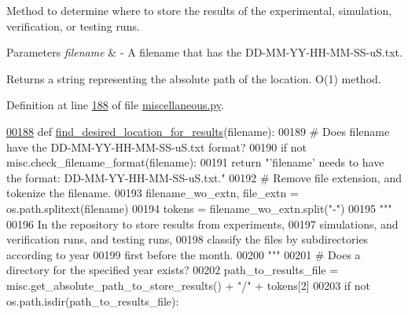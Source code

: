 Method to determine where to store the results of the experimental, simulation, verification, or testing runs. 


\begin{DoxyParams}{Parameters}
{\em filename} & -\/ A filename that has the D\+D-\/\+M\+M-\/\+Y\+Y-\/\+H\+H-\/\+M\+M-\/\+S\+S-\/u\+S.\+txt. \\
\hline
\end{DoxyParams}
\begin{DoxyReturn}{Returns}
a string representing the absolute path of the location. O(1) method. 
\end{DoxyReturn}


Definition at line \hyperlink{miscellaneous_8py_source_l00188}{188} of file \hyperlink{miscellaneous_8py_source}{miscellaneous.\+py}.


\begin{DoxyCode}
\hypertarget{classutilities_1_1miscellaneous_1_1misc_l00188}{}\hyperlink{classutilities_1_1miscellaneous_1_1misc_ab675e34a1a463f5a6aac272debe372ae}{00188}     \textcolor{keyword}{def }\hyperlink{classutilities_1_1miscellaneous_1_1misc_ab675e34a1a463f5a6aac272debe372ae}{find\_desired\_location\_for\_results}(filename):
00189         \textcolor{comment}{# Does filename have the DD-MM-YY-HH-MM-SS-uS.txt format?}
00190         \textcolor{keywordflow}{if} \textcolor{keywordflow}{not} misc.check\_filename\_format(filename):
00191             \textcolor{keywordflow}{return} \textcolor{stringliteral}{"'filename' needs to have the format: DD-MM-YY-HH-MM-SS-uS.txt."}
00192         \textcolor{comment}{# Remove file extension, and tokenize the filename.}
00193         filename\_wo\_extn, file\_extn = os.path.splitext(filename)
00194         tokens = filename\_wo\_extn.split(\textcolor{stringliteral}{"-"})
00195         \textcolor{stringliteral}{"""}
00196 \textcolor{stringliteral}{            In the repository to store results from experiments,}
00197 \textcolor{stringliteral}{                simulations, and verification runs, and testing runs,}
00198 \textcolor{stringliteral}{                classify the files by subdirectories according to year}
00199 \textcolor{stringliteral}{                first before the month.}
00200 \textcolor{stringliteral}{        """}
00201         \textcolor{comment}{# Does a directory for the specified year exists?}
00202         path\_to\_results\_file = misc.get\_absolute\_path\_to\_store\_results() +  \textcolor{stringliteral}{"/"} + tokens[2]
00203         \textcolor{keywordflow}{if} \textcolor{keywordflow}{not} os.path.isdir(path\_to\_results\_file):

\end{DoxyCode}
